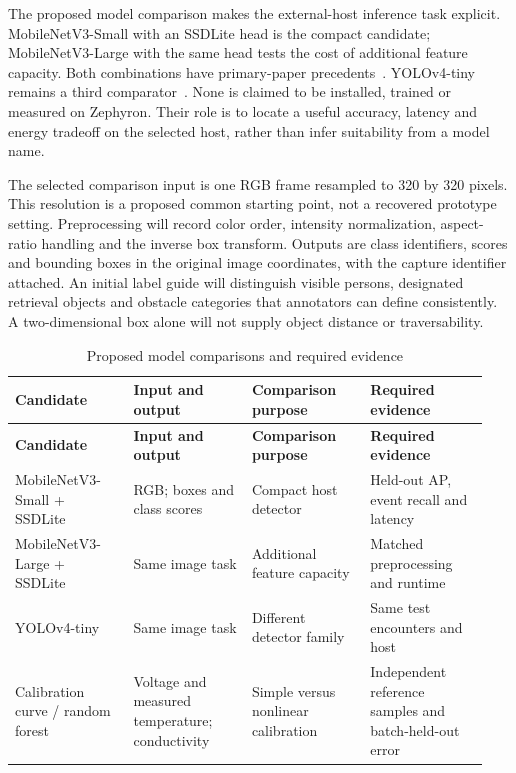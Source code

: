 \documentclass[11pt,letterpaper]{article}
\begin{document}
The proposed model comparison makes the external-host inference task explicit. MobileNetV3-Small with an SSDLite head is the compact candidate; MobileNetV3-Large with the same head tests the cost of additional feature capacity. Both combinations have primary-paper precedents~\cite{ENG_MOBILENETV3}. YOLOv4-tiny remains a third comparator~\cite{ENG_SCALED}. None is claimed to be installed, trained or measured on Zephyron. Their role is to locate a useful accuracy, latency and energy tradeoff on the selected host, rather than infer suitability from a model name.

The selected comparison input is one RGB frame resampled to 320 by 320 pixels. This resolution is a proposed common starting point, not a recovered prototype setting. Preprocessing will record color order, intensity normalization, aspect-ratio handling and the inverse box transform. Outputs are class identifiers, scores and bounding boxes in the original image coordinates, with the capture identifier attached. An initial label guide will distinguish visible persons, designated retrieval objects and obstacle categories that annotators can define consistently. A two-dimensional box alone will not supply object distance or traversability.

\begingroup
\small
\setlength{\tabcolsep}{4pt}
\renewcommand{\arraystretch}{1.14}
\begin{longtable}{@{}>{\raggedright\arraybackslash}p{0.236\linewidth}>{\raggedright\arraybackslash}p{0.236\linewidth}>{\raggedright\arraybackslash}p{0.236\linewidth}>{\raggedright\arraybackslash}p{0.236\linewidth}@{}}
\caption{Proposed model comparisons and required evidence}\label{tab:5}\\
\toprule
\rowcolor{tablehead} \textbf{Candidate} & \textbf{Input and output} & \textbf{Comparison purpose} & \textbf{Required evidence} \\
\midrule
\endfirsthead
\toprule
\rowcolor{tablehead} \textbf{Candidate} & \textbf{Input and output} & \textbf{Comparison purpose} & \textbf{Required evidence} \\
\midrule
\endhead
\bottomrule
\endfoot
MobileNetV3-Small + SSDLite & RGB; boxes and class scores & Compact host detector & Held-out AP, event recall and latency \\[2pt]
MobileNetV3-Large + SSDLite & Same image task & Additional feature capacity & Matched preprocessing and runtime \\[2pt]
YOLOv4-tiny & Same image task & Different detector family & Same test encounters and host \\[2pt]
Calibration curve / random forest & Voltage and measured temperature; conductivity & Simple versus nonlinear calibration & Independent reference samples and batch-held-out error \\[2pt]
\end{longtable}
\endgroup
\end{document}
